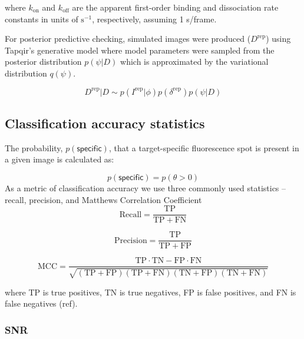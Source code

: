 \noindent
where $k_{\mathrm{on}}$ and $k_{\mathrm{off}}$ are the apparent first-order binding and dissociation rate constants in units of $\mathrm{s}^{-1}$, respectively, assuming 1 s/frame.

For posterior predictive checking, simulated images were produced ($D^\mathrm{rep}$) using Tapqir's generative model where model parameters were sampled from the posterior distribution $p(\psi|D)$ which is approximated by the variational distribution $q(\psi)$. %

\begin{equation}
    D^\mathrm{rep} | D \sim p(I^\mathrm{rep} | \phi) p(\delta^\mathrm{rep}) p(\psi | D)
\end{equation}

\subsection*{Classification accuracy statistics}
The probability, $p(\mathsf{specific})$, that a target-specific fluorescence spot is present in a given image is calculated as:

\begin{equation}
    p(\mathsf{specific}) = p(\theta > 0)
\end{equation}
As a metric of classification accuracy we use three commonly used statistics -- recall, precision, and Matthews Correlation Coefficient \cite{Matthews1975-rw}
\begin{equation}
    \mathrm{Recall} = \dfrac{\mathrm{TP}}{\mathrm{TP} + \mathrm{FN}}
\end{equation}

\begin{equation}
    \mathrm{Precision} = \dfrac{\mathrm{TP}}{\mathrm{TP} + \mathrm{FP}}
\end{equation}

\begin{equation}
    \mathrm{MCC} =
        \dfrac{\mathrm{TP} \cdot \mathrm{TN} - \mathrm{FP} \cdot \mathrm{FN}}
        {\sqrt{(\mathrm{TP} + \mathrm{FP}) (\mathrm{TP} + \mathrm{FN}) (\mathrm{TN} + \mathrm{FP}) (\mathrm{TN} + \mathrm{FN})}}
\end{equation}

\noindent
where TP is true positives, TN is true negatives, FP is false positives, and FN is false negatives (ref).

\subsubsection*{SNR}

